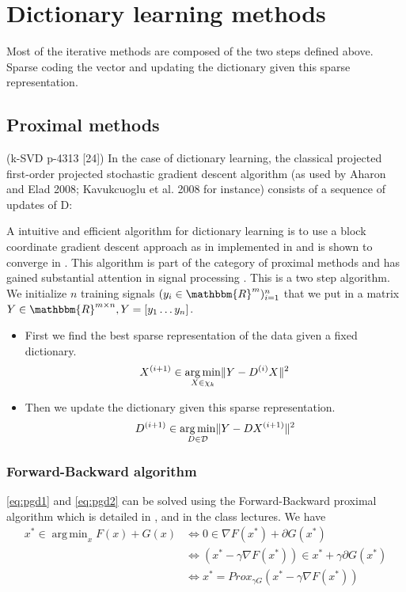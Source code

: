 \documentclass[a4paper,11pt]{article}
\newcommand{\RR}{\mathbbm{R}} %
\DeclarePairedDelimiter\norm{\lVert}{\rVert} %
\DeclareMathOperator*{\argmin}{arg\,min} %
\begin{document}
\section{Dictionary learning methods}
Most of the iterative methods are composed of the two steps defined above.
Sparse coding the vector and updating the dictionary given this sparse representation.


\subsection{Proximal methods}
\cite{olshausen97} (k-SVD p-4313 [24])
In the case of dictionary learning, the classical projected first-order projected stochastic gradient
descent algorithm (as used by Aharon and Elad 2008; Kavukcuoglu et al. 2008 for instance) consists
of a sequence of updates of D:



A intuitive and efficient algorithm for dictionary learning is to use a block coordinate gradient descent approach as in implemented in \cite{nt4} and is shown to converge in \cite{tseng01}.
This algorithm is part of the category of proximal methods and has gained substantial attention in signal processing \cite{combettes11}.
This is a two step algorithm.
We initialize $n$ training signals $(y_i \in \RR^m)_{i=1}^{n}$
that we put in a matrix $Y \in \RR^{m \times n}, Y = [y_1 \ldots y_n]$.
\begin{itemize}
  \item First we find the best sparse representation of the data given a fixed dictionary.
  	\begin{equation} \label{eq:pgd1}
      X^{(i+1)} \in \argmin_{X \in \chi_k} \norm{Y - D^{(i)}X}^2
	\end{equation}
  \item Then we update the dictionary given this sparse representation.
  	\begin{equation} \label{eq:pgd2}
      D^{(i+1)} \in \argmin_{D \in \mathcal{D}} \norm{Y - DX^{(i+1)}}^2
	\end{equation}
\end{itemize}


\subsubsection*{Forward-Backward algorithm}
\ref{eq:pgd1} and \ref{eq:pgd2} can be solved using the Forward-Backward proximal algorithm which is detailed in \cite{combettes11}, \cite{parikh14} and in the class lectures.
We have
\begin{equation*}
\begin{split}
x^* \in \argmin_x F(x) + G(x) & \Longleftrightarrow 0 \in \nabla F(x^*) + \partial G(x^*)\\
							  & \Longleftrightarrow (x^* - \gamma \nabla F(x^*)) \in x^* + \gamma \partial G(x^*)\\
                              & \Longleftrightarrow x^* = Prox_{\gamma G} (x^* - \gamma \nabla F(x^*))
\end{split}
\end{equation*}
\end{document}
